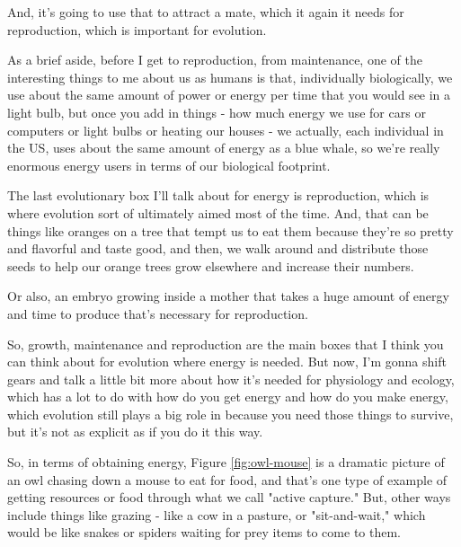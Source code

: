 \documentclass[]{article}
\begin{document}
And, it's going to use that
to attract a mate,
which it again
it needs for reproduction,
which is important for evolution.

As a brief aside,
before I get to reproduction,
from maintenance,
one of the interesting things to me
about us as humans is that,
individually biologically,
we use about the same amount of power
or energy per time
that you would see in a light bulb,
but once you add in things -
how much energy we use for cars
or computers or light bulbs
or heating our houses -
we actually, each individual in the US,
uses about the same amount of energy
as a blue whale,
so we're really enormous energy users
in terms of our biological footprint.

The last evolutionary box I'll talk about
for energy is reproduction,
which is where evolution sort of
ultimately aimed most of the time.
And, that can be things
like oranges on a tree
that tempt us to eat them
because they're so pretty
and flavorful and taste good,
and then, we walk around
and distribute those seeds
to help our orange trees grow elsewhere
and increase their numbers.

Or also, an embryo
growing inside a mother
that takes a huge amount of energy
and time to produce
that's necessary for reproduction.

So, growth, maintenance
and reproduction
are the main boxes that I think
you can think about for evolution
where energy is needed.
But now, I'm gonna shift gears
and talk a little bit more
about how it's needed
for physiology and ecology,
which has a lot to do with
how do you get energy
and how do you make energy,
which evolution still plays a big role in
because you need those things to survive,
but it's not as explicit as
if you do it this way.

So, in terms of obtaining energy,
Figure \ref{fig:owl-mouse} is a dramatic picture of an owl
chasing down a mouse to eat for food,
and that's one type of example
of getting resources or food
through what we call "active capture."
But, other ways include things
like grazing - like a cow in a pasture,
or "sit-and-wait,"
which would be like snakes or spiders
waiting for prey items to come to them.
\end{document}
